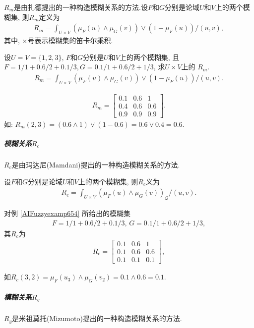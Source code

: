$R_m$是由扎德提出的一种构造模糊关系的方法.设$F$和$G$分别是论域$U$和$V$上的两个模糊集, 则$R_m$定义为
\begin{align}
  R_{m}=\int_{U \times V}\left(\mu_{F}(u) \wedge \mu_{G}(v)\right) \vee\left(1-\mu_{F}(u)\right) /(u, v),
\end{align}
其中, $\times$号表示模糊集的笛卡尔乘积.
\begin{example}\label{AIFuzzyexamp654}
 设$U=V=\{1,2,3\}$, $F$和$G$分别是$U$和$V$上的两个模糊集, 且$F=1/1+0.6/2+0.1/3,G=0.1/1+0.6/2+1/3$, 求$U\times V$上的 $R_m$.
\begin{align*}
    R_{m}=\int_{U \times V}\left(\mu_{F}(u) \wedge \mu_{G}(v)\right) \vee\left(1-\mu_{F}(u)\right) /(u, v).
\end{align*}
\vspace{-0.3cm}
\end{example}
\begin{result}
\begin{align*}
    R_{m}=\left[\begin{array}{ccc}{0.1} & {0.6} & {1} \\ {0.4} & {0.6} & {0.6} \\ {0.9} & {0.9} & {0.9}\end{array}\right].
\end{align*}
如: $R_m(2, 3) =(0.6\wedge 1)\vee (1-0.6)=0.6\vee 0.4=0.6$.
\end{result}
\subparagraph{模糊关系$R_c$}
$R_c$是由玛达尼(Mamdani)提出的一种构造模糊关系的方法.

设$F$和$G$分别是论域$U$和$V$上的两个模糊集, 则$R_c$义为
\begin{align*}
  R_{c}=\int_{U \times V}\left(\mu_{F}(u) \wedge \mu_{G}(v)\right)_{\mathcal{Q}} /(u, v).
\end{align*}
\begin{example}
对例 \ref{AIFuzzyexamp654} 所给出的模糊集
\begin{align*}
    F=1/1+0.6/2+0.1/3,\, G=0.1/1+0.6/2+1/3,
\end{align*}
其$R_c$为
\begin{align*}
    R_{c}=\left[\begin{array}{ccc}{0.1} & {0.6} & {1} \\
    {0.1} & {0.6} & {0.6} \\ {0.1} & {0.1} & {0.1}\end{array}\right],
\end{align*}
\vspace{-0.2cm}
\end{example}
如$R_{c}(3,2)=\mu_{F}\left(u_{3}\right) \wedge \mu_{G}\left(v_{2}\right)=0.1 \wedge 0.6=0.1$.
\subparagraph{模糊关系$R_g$}
$R_g$是米祖莫托(Mizumoto)提出的一种构造模糊关系的方法.


